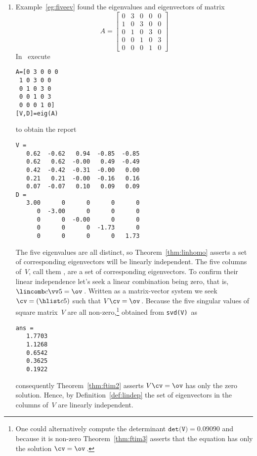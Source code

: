 \begin{example}
\begin{enumerate}
\item\label{eg:indepeva} Example~\ref{eg:fiveev} found the eigenvalues and eigenvectors of matrix
\begin{equation*}
A=\begin{bmatrix}0&3&0&0&0
\\1&0&3&0&0
\\0&1&0&3&0
\\0&0&1&0&3
\\0&0&0&1&0\end{bmatrix}
\end{equation*}
In \script\ execute
\begin{verbatim}
A=[0 3 0 0 0
 1 0 3 0 0
 0 1 0 3 0
 0 0 1 0 3
 0 0 0 1 0]
[V,D]=eig(A)
\end{verbatim}
\setbox\ajrqrbox\hbox{}%
\marginpar{\usebox{\ajrqrbox}}%
to obtain the report \twodp
\begin{verbatim}
V =
   0.62  -0.62   0.94  -0.85  -0.85
   0.62   0.62  -0.00   0.49  -0.49
   0.42  -0.42  -0.31  -0.00   0.00
   0.21   0.21  -0.00  -0.16   0.16
   0.07  -0.07   0.10   0.09   0.09
D =
   3.00      0      0      0      0
      0  -3.00      0      0      0
      0      0  -0.00      0      0
      0      0      0  -1.73      0
      0      0      0      0   1.73
\end{verbatim}
The five eigenvalues are all distinct, so Theorem~\ref{thm:linhomo} asserts a set of corresponding eigenvectors will be linearly independent.
The five columns of~\(V\), call them \hlist{}, are a set of corresponding eigenvectors.
To confirm their linear independence let's seek a linear combination being zero, that is, \(\lincomb c\vv5=\ov\)\,.
Written as a matrix-vector system we seek \(\cv=(\hlist c5)\) such that \(V\cv=\ov\)\,.
Because the five singular values of square matrix~\(V\) are all non-zero,\footnote{One could alternatively compute the determinant \(\texttt{det(V)}=0.09090\) and because it is non-zero Theorem~\ref{thm:ftim3} asserts that the equation has only the solution \(\cv=\ov\)\,.} obtained from \verb|svd(V)|~as
\begin{verbatim}
ans =
   1.7703
   1.1268
   0.6542
   0.3625
   0.1922
\end{verbatim}
consequently Theorem~\ref{thm:ftim2} asserts \(V\cv=\ov\) has only the zero solution.
Hence, by Definition~\ref{def:lindep} the set of eigenvectors in the columns of~\(V\) are linearly independent. 

\end{enumerate}
\end{example}


